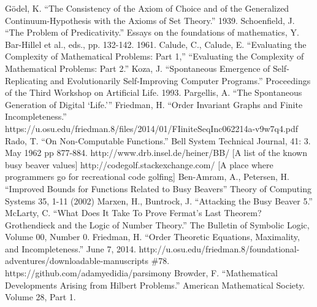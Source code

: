 \documentclass[11pt]{article}
\begin{document}
\begin{thebibliography}{100}
 G\"odel, K. ``The Consistency of the Axiom of Choice and of the Generalized Continuum-Hypothesis with the Axioms of Set Theory.'' 1939.
 Schoenfield, J. ``The Problem of Predicativity.'' Essays on the foundations of mathematics, Y. Bar-Hillel et al., eds., pp. 132-142. 1961.
 Calude, C., Calude, E. ``Evaluating the Complexity of Mathematical Problems: Part 1,'' ``Evaluating the Complexity of Mathematical Problems: Part 2.''
 Koza, J. ``Spontaneous Emergence of Self-Replicating and Evolutionarily Self-Improving Computer Programs.'' Proceedings of the Third Workshop on Artificial Life. 1993.
 Pargellis, A. ``The Spontaneous Generation of Digital `Life.''' 
 Friedman, H. ``Order Invariant Graphs and Finite Incompleteness.'' https://u.osu.edu/friedman.8/files/2014/01/FIiniteSeqInc062214a-v9w7q4.pdf
 Rado, T. ``On Non-Computable Functions.'' 
Bell System Technical Journal, 41: 3. May 1962 pp 877-884.
 http://www.drb.insel.de/heiner/BB/ [A list of the known busy beaver values]
 http://codegolf.stackexchange.com/ [A place where programmers go for recreational code golfing]
 Ben-Amram, A., Petersen, H. ``Improved Bounds for Functions Related to Busy Beavers'' Theory of Computing Systems 35, 1-11 (2002)
 Marxen, H., Buntrock, J. ``Attacking the Busy Beaver 5.'' 
 McLarty, C. ``What Does It Take To Prove Fermat's Last Theorem? Grothendieck and the Logic of Number Theory.'' The Bulletin of Symbolic Logic, Volume 00, Number 0.
 Friedman, H. ``Order Theoretic Equations, Maximality, and Incompleteness.'' June 7, 2014. http://u.osu.edu/friedman.8/foundational-adventures/downloadable-manuscripts \#78.
 https://github.com/adamyedidia/parsimony
 Browder, F. ``Mathematical Developments Arising from Hilbert Problems.'' American Mathematical Society. Volume 28, Part 1.
\end{thebibliography}
\end{document}
